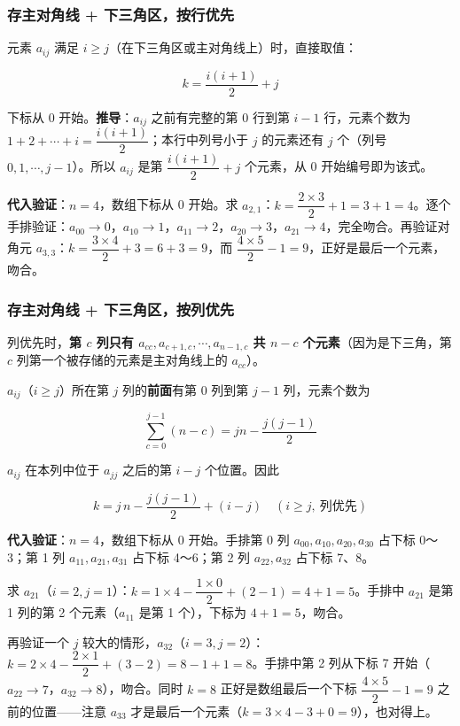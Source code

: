 \documentclass[11pt,openany,UTF8]{ctexbook}
\begin{document}
\subsubsection{存主对角线 + 下三角区，按行优先}

元素 $a_{ij}$ 满足 $i \ge j$（在下三角区或主对角线上）时，直接取值：

\[k = \frac{i(i+1)}{2} + j\]

下标从 0 开始。\textbf{推导}：$a_{ij}$ 之前有完整的第 $0$ 行到第 $i-1$ 行，元素个数为 $1 + 2 + \cdots + i = \dfrac{i(i+1)}{2}$；本行中列号小于 $j$ 的元素还有 $j$ 个（列号 $0, 1, \cdots, j-1$）。所以 $a_{ij}$ 是第 $\dfrac{i(i+1)}{2} + j$ 个元素，从 0 开始编号即为该式。

\textbf{代入验证}：$n = 4$，数组下标从 0 开始。求 $a_{2,1}$：$k = \dfrac{2 \times 3}{2} + 1 = 3 + 1 = 4$。逐个手排验证：$a_{00} \to 0$，$a_{10} \to 1$，$a_{11} \to 2$，$a_{20} \to 3$，$a_{21} \to 4$，完全吻合。再验证对角元 $a_{3,3}$：$k = \dfrac{3 \times 4}{2} + 3 = 6 + 3 = 9$，而 $\dfrac{4 \times 5}{2} - 1 = 9$，正好是最后一个元素，吻合。

\subsubsection{存主对角线 + 下三角区，按列优先}

列优先时，\textbf{第 $c$ 列只有 $a_{cc}, a_{c+1,c}, \cdots, a_{n-1,c}$ 共 $n - c$ 个元素}（因为是下三角，第 $c$ 列第一个被存储的元素是主对角线上的 $a_{cc}$）。

$a_{ij}$（$i \ge j$）所在第 $j$ 列的\textbf{前面}有第 $0$ 列到第 $j-1$ 列，元素个数为

\[\sum_{c=0}^{j-1}(n-c) = jn - \frac{j(j-1)}{2}\]

$a_{ij}$ 在本列中位于 $a_{jj}$ 之后的第 $i - j$ 个位置。因此

\[k = j\,n - \frac{j(j-1)}{2} + (i - j) \quad (i \ge j,\ \text{列优先})\]

\textbf{代入验证}：$n = 4$，数组下标从 0 开始。手排第 0 列 $a_{00},a_{10},a_{20},a_{30}$ 占下标 0～3；第 1 列 $a_{11},a_{21},a_{31}$ 占下标 4～6；第 2 列 $a_{22},a_{32}$ 占下标 7、8。

求 $a_{21}$（$i=2, j=1$）：$k = 1 \times 4 - \dfrac{1 \times 0}{2} + (2-1) = 4 + 1 = 5$。手排中 $a_{21}$ 是第 1 列的第 2 个元素（$a_{11}$ 是第 1 个），下标为 $4 + 1 = 5$，吻合。

再验证一个 $j$ 较大的情形，$a_{32}$（$i=3, j=2$）：$k = 2 \times 4 - \dfrac{2 \times 1}{2} + (3-2) = 8 - 1 + 1 = 8$。手排中第 2 列从下标 7 开始（$a_{22} \to 7$，$a_{32} \to 8$），吻合。同时 $k = 8$ 正好是数组最后一个下标 $\dfrac{4 \times 5}{2} - 1 = 9$ 之前的位置——注意 $a_{33}$ 才是最后一个元素（$k = 3 \times 4 - 3 + 0 = 9$），也对得上。
\end{document}
